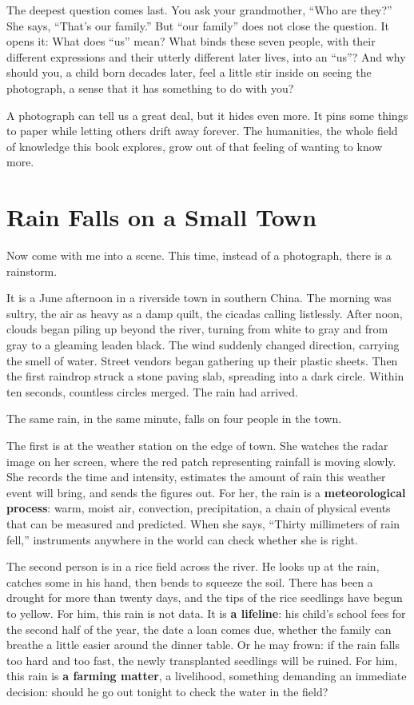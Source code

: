 The deepest question comes last. You ask your grandmother, ``Who are they?'' She says, ``That's our family.'' But ``our family'' does not close the question. It opens it: What does ``us'' mean? What binds these seven people, with their different expressions and their utterly different later lives, into an ``us''? And why should you, a child born decades later, feel a little stir inside on seeing the photograph, a sense that it has something to do with you?

A photograph can tell us a great deal, but it hides even more. It pins some things to paper while letting others drift away forever. The humanities, the whole field of knowledge this book explores, grow out of that feeling of wanting to know more.

\section{Rain Falls on a Small Town}
Now come with me into a scene. This time, instead of a photograph, there is a rainstorm.

It is a June afternoon in a riverside town in southern China. The morning was sultry, the air as heavy as a damp quilt, the cicadas calling listlessly. After noon, clouds began piling up beyond the river, turning from white to gray and from gray to a gleaming leaden black. The wind suddenly changed direction, carrying the smell of water. Street vendors began gathering up their plastic sheets. Then the first raindrop struck a stone paving slab, spreading into a dark circle. Within ten seconds, countless circles merged. The rain had arrived.

The same rain, in the same minute, falls on four people in the town.

The first is at the weather station on the edge of town. She watches the radar image on her screen, where the red patch representing rainfall is moving slowly. She records the time and intensity, estimates the amount of rain this weather event will bring, and sends the figures out. For her, the rain is a \textbf{meteorological process}: warm, moist air, convection, precipitation, a chain of physical events that can be measured and predicted. When she says, ``Thirty millimeters of rain fell,'' instruments anywhere in the world can check whether she is right.

The second person is in a rice field across the river. He looks up at the rain, catches some in his hand, then bends to squeeze the soil. There has been a drought for more than twenty days, and the tips of the rice seedlings have begun to yellow. For him, this rain is not data. It is \textbf{a lifeline}: his child's school fees for the second half of the year, the date a loan comes due, whether the family can breathe a little easier around the dinner table. Or he may frown: if the rain falls too hard and too fast, the newly transplanted seedlings will be ruined. For him, this rain is \textbf{a farming matter}, a livelihood, something demanding an immediate decision: should he go out tonight to check the water in the field?

